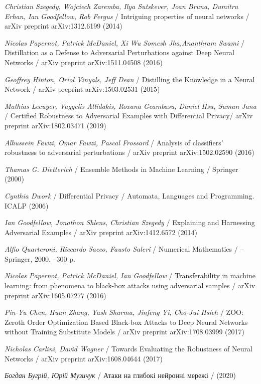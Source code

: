 \documentclass[14pt,a4paper]{extarticle}
\newcounter{e}
\numberwithin{equation}{section}
\numberwithin{figure}{section}
\begin{document}
 \newpage
 \thispagestyle{empty}
 \begin{thebibliography}{99}
	
	\textit{Christian Szegedy, Wojciech Zaremba, Ilya Sutskever, Joan Bruna, Dumitru Erhan, Ian Goodfellow, Rob Fergus} /
	Intriguing properties of neural networks /
	arXiv preprint arXiv:1312.6199 (2014)
	
	\textit{Nicolas Papernot, Patrick McDaniel, Xi Wu Somesh Jha,Ananthram Swami} /
	Distillation as a Defense to Adversarial Perturbations against Deep Neural Networks /
	arXiv preprint arXiv:1511.04508 (2016)
	
	\textit{Geoffrey Hinton, Oriol Vinyals, Jeff Dean} /
	Distilling the Knowledge in a Neural Network /
	arXiv preprint arXiv:1503.02531 (2015)
	
	\textit{Mathias Lecuyer, Vaggelis Atlidakis, Roxana Geambasu, Daniel Hsu, Suman Jana} /
	Certified Robustness to Adversarial Examples with Differential Privacy/
	arXiv preprint arXiv:1802.03471 (2019)
	
	\textit{Alhussein Fawzi, Omar Fawzi, Pascal Frossard} /
	Analysis of classifiers' robustness to adversarial perturbations /
	arXiv preprint arXiv:1502.02590 (2016)
	
	\textit{Thamas G. Dietterich} /
	Ensemble Methods in Machine Learning /
	Springer (2000)
	
	\textit{Cynthia Dwork} /
	Differential Privacy /
	Automata, Languages and Programming. ICALP (2006)
	
	\textit{Ian Goodfellow, Jonathon Shlens, Christian Szegedy} /
	Explaining and Harnessing Adversarial Examples /
	arXiv preprint arXiv:1412.6572 (2014)
	
	\textit{Alfio Quarteroni, Riccardo Sacco, Fausto Saleri} /
	Numerical Mathematics / --
	Springer, 2000. --300 p.
	
	\textit{Nicolas Papernot, Patrick McDaniel, Ian Goodfellow} /
	Transferability in machine learning: from phenomena to black-box attacks using adversarial samples /
	arXiv preprint arXiv:1605.07277 (2016)
	
	\textit{Pin-Yu Chen, Huan Zhang, Yash Sharma, Jinfeng Yi, Cho-Jui Hsieh} /
	ZOO: Zeroth Order Optimization Based Black-box Attacks to Deep Neural Networks without Training Substitute Models /
	arXiv preprint arXiv:1708.03999 (2017)
	
	\textit{Nicholas Carlini, David Wagner} /
	Towards Evaluating the Robustness of Neural Networks /
	arXiv preprint arXiv:1608.04644 (2017)
	
	\textit{Богдан Бугрій, Юрій Музичук} /
	Атаки на глибокі нейронні мережі /
	(2020)
	
	
 \end{thebibliography}

 
\end{document}
